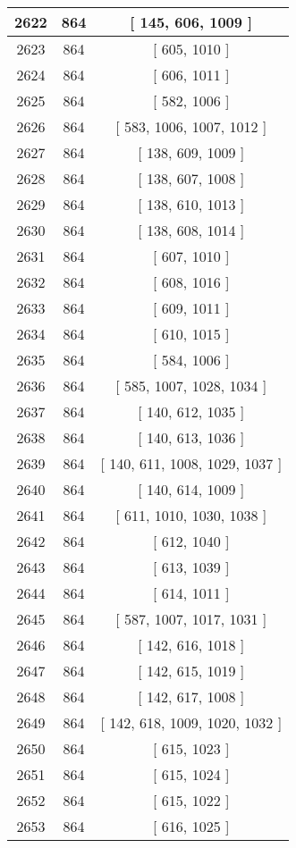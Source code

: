 \begin{center}
\begin{longtable}[H]{|| c c c ||}
\hline
2622 & 864 & [ 145, 606, 1009 ] \\ 
\hline
2623 & 864 & [ 605, 1010 ] \\ 
\hline
2624 & 864 & [ 606, 1011 ] \\ 
\hline
2625 & 864 & [ 582, 1006 ] \\ 
\hline
2626 & 864 & [ 583, 1006, 1007, 1012 ] \\ 
\hline
2627 & 864 & [ 138, 609, 1009 ] \\ 
\hline
2628 & 864 & [ 138, 607, 1008 ] \\ 
\hline
2629 & 864 & [ 138, 610, 1013 ] \\ 
\hline
2630 & 864 & [ 138, 608, 1014 ] \\ 
\hline
2631 & 864 & [ 607, 1010 ] \\ 
\hline
2632 & 864 & [ 608, 1016 ] \\ 
\hline
2633 & 864 & [ 609, 1011 ] \\ 
\hline
2634 & 864 & [ 610, 1015 ] \\ 
\hline
2635 & 864 & [ 584, 1006 ] \\ 
\hline
2636 & 864 & [ 585, 1007, 1028, 1034 ] \\ 
\hline
2637 & 864 & [ 140, 612, 1035 ] \\ 
\hline
2638 & 864 & [ 140, 613, 1036 ] \\ 
\hline
2639 & 864 & [ 140, 611, 1008, 1029, 1037 ] \\ 
\hline
2640 & 864 & [ 140, 614, 1009 ] \\ 
\hline
2641 & 864 & [ 611, 1010, 1030, 1038 ] \\ 
\hline
2642 & 864 & [ 612, 1040 ] \\ 
\hline
2643 & 864 & [ 613, 1039 ] \\ 
\hline
2644 & 864 & [ 614, 1011 ] \\ 
\hline
2645 & 864 & [ 587, 1007, 1017, 1031 ] \\ 
\hline
2646 & 864 & [ 142, 616, 1018 ] \\ 
\hline
2647 & 864 & [ 142, 615, 1019 ] \\ 
\hline
2648 & 864 & [ 142, 617, 1008 ] \\ 
\hline
2649 & 864 & [ 142, 618, 1009, 1020, 1032 ] \\ 
\hline
2650 & 864 & [ 615, 1023 ] \\ 
\hline
2651 & 864 & [ 615, 1024 ] \\ 
\hline
2652 & 864 & [ 615, 1022 ] \\ 
\hline
2653 & 864 & [ 616, 1025 ] \\ 

\end{longtable}
\end{center}
